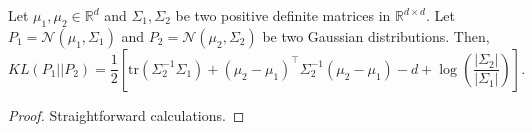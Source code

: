\documentclass[12pt]{article}
\begin{document}
\begin{lemma}
    \label{lem:kl_gaussians}
    Let $\mu_1, \mu_2 \in \mathbb{R}^d$ and $\Sigma_1, \Sigma_2$ 
    be two positive definite matrices in $\mathbb{R}^{d \times d}$.
    Let $P_1 = \mathcal{N}(\mu_1, \Sigma_1)$ and $P_2 = \mathcal{N}(\mu_2, \Sigma_2)$
    be two Gaussian distributions.
    Then,
    \begin{equation}
    KL(P_1 || P_2) = \frac{1}{2} \left[ \text{tr}(\Sigma_2^{-1} \Sigma_1) + 
    (\mu_2 - \mu_1)^\top \Sigma_2^{-1} (\mu_2 - \mu_1) - d + \log\left(\frac{|\Sigma_2|}{|\Sigma_1|}\right) \right].
    \end{equation}
\end{lemma}

\begin{proof}
    Straightforward calculations.
\end{proof}
\end{document}
